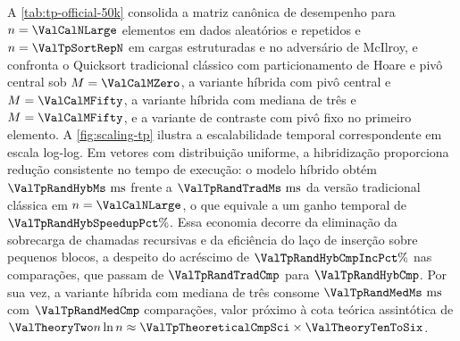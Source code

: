 \documentclass[12pt]{article}
\begin{document}
A \cref{tab:tp-official-50k} consolida a matriz canônica de desempenho para $n = \ValCalNLarge$ elementos em dados aleatórios e repetidos e $n = \ValTpSortRepN$ em cargas estruturadas e no adversário de McIlroy, e confronta o Quicksort tradicional clássico com particionamento de Hoare e pivô central sob $M = \ValCalMZero$, a variante híbrida com pivô central e $M = \ValCalMFifty$, a variante híbrida com mediana de três e $M = \ValCalMFifty$, e a variante de contraste com pivô fixo no primeiro elemento. A \cref{fig:scaling-tp} ilustra a escalabilidade temporal correspondente em escala log-log. Em vetores com distribuição uniforme, a hibridização proporciona redução consistente no tempo de execução: o modelo híbrido obtém $\ValTpRandHybMs\text{ ms}$ frente a $\ValTpRandTradMs\text{ ms}$ da versão tradicional clássica em $n = \ValCalNLarge$, o que equivale a um ganho temporal de $\ValTpRandHybSpeedupPct\%$. Essa economia decorre da eliminação da sobrecarga de chamadas recursivas e da eficiência do laço de inserção sobre pequenos blocos, a despeito do acréscimo de $\ValTpRandHybCmpIncPct\%$ nas comparações, que passam de $\ValTpRandTradCmp$ para $\ValTpRandHybCmp$. Por sua vez, a variante híbrida com mediana de três consome $\ValTpRandMedMs\text{ ms}$ com $\ValTpRandMedCmp$ comparações, valor próximo à cota teórica assintótica de $\ValTheoryTwo n \ln n \approx \ValTpTheoreticalCmpSci\times \ValTheoryTenToSix$.
\end{document}
